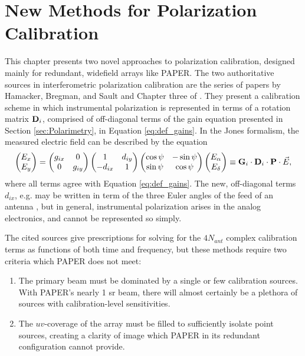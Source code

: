 \chapter{New Methods for Polarization Calibration}\label{chap:PolCal}

This chapter presents two novel approaches to polarization calibration, designed mainly for
redundant, widefield arrays like PAPER. The two authoritative sources in interferometric
polarization calibration are the series of papers by Hamacker, Bregman, and Sault \cite{HBS1,HBS2,HBS3,HBS4,HBS5} and
Chapter three of \citet{TMS}. They present a calibration scheme in which instrumental
polarization is represented in terms of a rotation matrix $\mathbf{D}_i$, comprised of off-diagonal
terms of the gain equation presented in Section \ref{sec:Polarimetry}, in Equation
\ref{eq:def_gains}. In the Jones formalism, the measured electric field can be described by
the equation 
\begin{equation}
  \begin{pmatrix}E_x\\E_y\end{pmatrix}
= \begin{pmatrix}g_{ix} & 0 \\ 0 &  g_{iy}\end{pmatrix}
  \begin{pmatrix}1&d_{iy}\\-d_{ix}&1\end{pmatrix}
  \begin{pmatrix}\cos\psi & -\sin\psi \\ \sin\psi & \cos\psi\end{pmatrix}
  \begin{pmatrix}E_\alpha\\E_\delta\end{pmatrix}
\equiv
  \mathbf{G}_i\cdot\mathbf{D}_i\cdot\mathbf{P}\cdot\vec{E},
  \label{eq:def_D}
\end{equation}
where all terms agree with Equation \ref{eq:def_gains}. The new, off-diagonal terms $d_{ix}$, e.g.
may be written in term of the three Euler angles of the feed of an antenna \cite{TMS}, but in
general, instrumental polarization arises in the analog electronics, and cannot be represented so
simply.

The cited sources give prescriptions for solving for the $4N_{ant}$ complex calibration terms as
functions of both time and frequency, but these methods require two criteria which PAPER does not meet:
\begin{enumerate}
  \item The primary beam must be dominated by a single or few calibration sources. With PAPER's
    nearly 1 sr beam, there will almost certainly be a plethora of sources with calibration-level
    sensitivities.
  \item The $uv$-coverage of the array must be filled to sufficiently isolate point sources,
    creating a clarity of image which PAPER in its redundant configuration cannot provide.
\end{enumerate}

